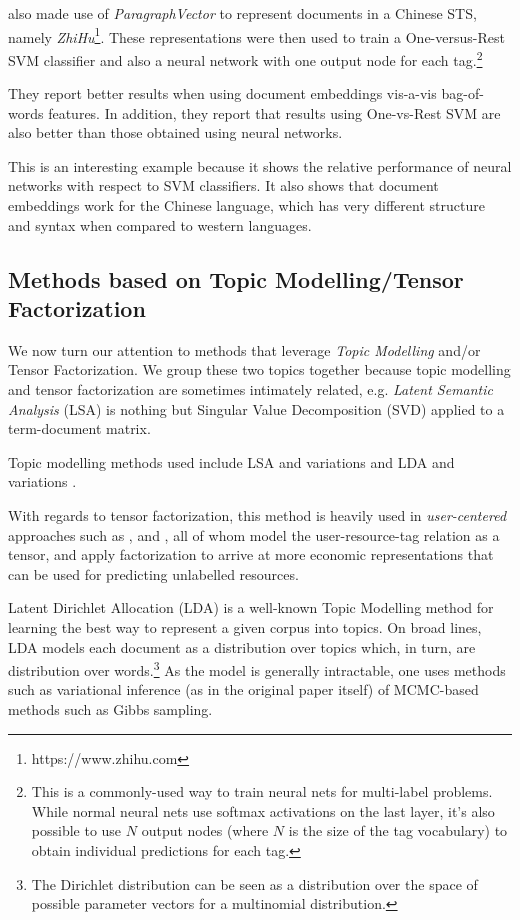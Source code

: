 \cite{tao_yao_2016} also made use of \textit{ParagraphVector} to represent documents in a Chinese STS, namely \textit{ZhiHu}\footnote{https://www.zhihu.com}. These representations were then used to train a One-versus-Rest SVM classifier and also a neural network with one output node for each tag.\footnote{This is a commonly-used way to train neural nets for multi-label problems. While normal neural nets use softmax activations on the last layer, it's also possible to use $N$ output nodes (where $N$ is the size of the tag vocabulary) to obtain individual predictions for each tag.}

They report better results when using document embeddings vis-a-vis bag-of-words features. In addition, they report that results using One-vs-Rest SVM are also better than those obtained using neural networks.

This is an interesting example because it shows the relative performance of neural networks with respect to SVM classifiers. It also shows that document embeddings work for the Chinese language, which has very different structure and syntax when compared to western languages.

\subsection{Methods based on Topic Modelling/Tensor Factorization}

We now turn our attention to methods that leverage \textit{Topic Modelling} and/or Tensor Factorization. We group these two topics together because topic modelling and tensor factorization are sometimes intimately related, e.g. \textit{Latent Semantic Analysis} (LSA) \citep{deerwester_etal_1990} is nothing but Singular Value Decomposition (SVD) applied to a term-document matrix.

Topic modelling methods used include LSA and variations \citep{zhang_etal_2014} and LDA and variations \citep{gong_etal_2017,wu_etal_2016,si_sun_2008}.

With regards to tensor factorization, this method is heavily used in \textit{user-centered} approaches such as \cite{rendle_schmidt-thieme_2009}, \cite{rendle_etal_2009} and \cite{symeonidis_etal_2008}, all of whom model the user-resource-tag relation as a tensor, and apply factorization to arrive at more economic representations that can be used for predicting unlabelled resources.

Latent Dirichlet Allocation (LDA) \citep{blei_etal_2003} is a well-known Topic Modelling method for learning the best way to represent a given corpus into topics. On broad lines, LDA models each document as a distribution over topics which, in turn, are distribution over words.\footnote{The Dirichlet distribution can be seen as a distribution over the space of possible parameter vectors for a multinomial distribution.} As the model is generally intractable, one uses methods such as variational inference (as in the original paper itself) of MCMC-based methods such as Gibbs sampling.

